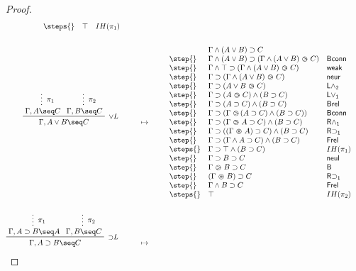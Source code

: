 \begin{proof}
\begin{align*}
\begin{array}{lll}
      \steps{} & \top & IH(\pi_1)
    \end{array}
    \\\\
    \R[\lor L]
      {\summ[$\pi_1$]{\Gamma, A \seq C}}
      {\summ[$\pi_2$]{\Gamma, B \seq C}}
      {\Gamma, A \lor B \seq C}
    &\mt
    \begin{array}{lll}
            & \Gamma \land (A \lor B) \limp C & \\
      \step{} & \Gamma \land (A \lor B) \limp (\Gamma \land (A \lor B) \back C) & \mathsf{Bconn} \\
      \step{} & \Gamma \land \top \limp (\Gamma \land (A \lor B) \back C) & \mathsf{weak} \\
      \step{} & \Gamma \limp (\Gamma \land (A \lor B) \back C) & \mathsf{neur} \\
      \step{} & \Gamma \limp (A \lor B \back C) & \mathsf{L\land_2} \\
      \step{} & \Gamma \limp (A \back C) \land (B \limp C) & \mathsf{L\lor_1} \\
      \step{} & \Gamma \limp (A \limp C) \land (B \limp C) & \mathsf{Brel} \\
      \step{} & \Gamma \limp (\Gamma \back (A \limp C) \land (B \limp C)) & \mathsf{Bconn} \\
      \step{} & \Gamma \limp (\Gamma \back A \limp C) \land (B \limp C) & \mathsf{R\land_1} \\
      \step{} & \Gamma \limp ((\Gamma \forw A) \limp C) \land (B \limp C) & \mathsf{R{\limp}_1} \\
      \step{} & \Gamma \limp (\Gamma \land A \limp C) \land (B \limp C) & \mathsf{Frel} \\
      \steps{} & \Gamma \limp \top \land (B \limp C) & IH(\pi_1) \\
      \step{} & \Gamma \limp B \limp C & \mathsf{neul} \\
      \step{} & \Gamma \back B \limp C & \mathsf{B} \\
      \step{} & (\Gamma \forw B) \limp C & \mathsf{R{\limp}_1} \\
      \step{} & \Gamma \land B \limp C & \mathsf{Frel} \\
      \steps{} & \top & IH(\pi_2)
    \end{array}
    \\\\
    \R[{\limp}L]
      {\summ[$\pi_1$]{\Gamma, A \limp B \seq A}}
      {\summ[$\pi_2$]{\Gamma, B \seq C}}
      {\Gamma, A \limp B \seq C}
    &\mt
    \begin{array}{lll}

\end{array}
\end{align*}
\end{proof}
